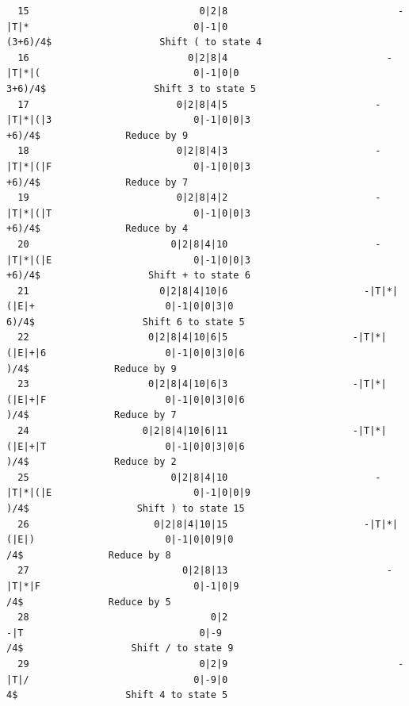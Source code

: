 \documentclass[UTF8]{ctexart}
\begin{document}
\begin{lstlisting}
  15                              0|2|8                              -|T|*                             0|-1|0                           (3+6)/4$                   Shift ( to state 4
  16                            0|2|8|4                            -|T|*|(                           0|-1|0|0                            3+6)/4$                   Shift 3 to state 5
  17                          0|2|8|4|5                          -|T|*|(|3                         0|-1|0|0|3                             +6)/4$               Reduce by 9
  18                          0|2|8|4|3                          -|T|*|(|F                         0|-1|0|0|3                             +6)/4$               Reduce by 7
  19                          0|2|8|4|2                          -|T|*|(|T                         0|-1|0|0|3                             +6)/4$               Reduce by 4
  20                         0|2|8|4|10                          -|T|*|(|E                         0|-1|0|0|3                             +6)/4$                   Shift + to state 6
  21                       0|2|8|4|10|6                        -|T|*|(|E|+                       0|-1|0|0|3|0                              6)/4$                   Shift 6 to state 5
  22                     0|2|8|4|10|6|5                      -|T|*|(|E|+|6                     0|-1|0|0|3|0|6                               )/4$               Reduce by 9
  23                     0|2|8|4|10|6|3                      -|T|*|(|E|+|F                     0|-1|0|0|3|0|6                               )/4$               Reduce by 7
  24                    0|2|8|4|10|6|11                      -|T|*|(|E|+|T                     0|-1|0|0|3|0|6                               )/4$               Reduce by 2
  25                         0|2|8|4|10                          -|T|*|(|E                         0|-1|0|0|9                               )/4$                   Shift ) to state 15
  26                      0|2|8|4|10|15                        -|T|*|(|E|)                       0|-1|0|0|9|0                                /4$               Reduce by 8
  27                           0|2|8|13                            -|T|*|F                           0|-1|0|9                                /4$               Reduce by 5
  28                                0|2                                -|T                               0|-9                                /4$                   Shift / to state 9
  29                              0|2|9                              -|T|/                             0|-9|0                                 4$                   Shift 4 to state 5

\end{lstlisting}
\end{document}
